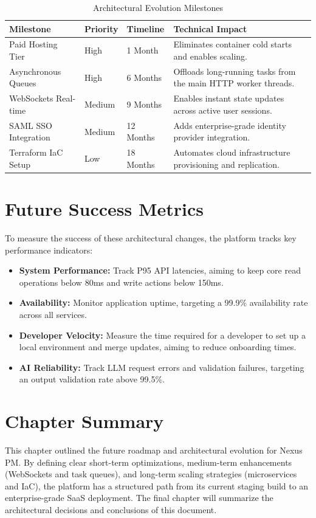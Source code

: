 \begin{table}[h!]
\centering
\small
\renewcommand{\arraystretch}{1.4}
\begin{tabularx}{\textwidth}{l l l X}
    \toprule[1.5pt]
    \rowcolor{primary!5}
    \textbf{\color{primary}Milestone} & \textbf{\color{primary}Priority} & \textbf{\color{primary}Timeline} & \textbf{\color{primary}Technical Impact} \\
    \midrule
    Paid Hosting Tier & High & 1 Month & Eliminates container cold starts and enables scaling. \\
    Asynchronous Queues & High & 6 Months & Offloads long-running tasks from the main HTTP worker threads. \\
    WebSockets Real-time & Medium & 9 Months & Enables instant state updates across active user sessions. \\
    SAML SSO Integration & Medium & 12 Months & Adds enterprise-grade identity provider integration. \\
    Terraform IaC Setup & Low & 18 Months & Automates cloud infrastructure provisioning and replication. \\
    \bottomrule[1.5pt]
\end{tabularx}
\caption{Architectural Evolution Milestones}
\label{tab:architectural_milestones}
\end{table}

\section{Future Success Metrics}
To measure the success of these architectural changes, the platform tracks key performance indicators:
\begin{itemize}
    \item \textbf{System Performance:} Track P95 API latencies, aiming to keep core read operations below 80ms and write actions below 150ms.
    \item \textbf{Availability:} Monitor application uptime, targeting a 99.9\% availability rate across all services.
    \item \textbf{Developer Velocity:} Measure the time required for a developer to set up a local environment and merge updates, aiming to reduce onboarding times.
    \item \textbf{AI Reliability:} Track LLM request errors and validation failures, targeting an output validation rate above 99.5\%.
\end{itemize}

\section{Chapter Summary}
This chapter outlined the future roadmap and architectural evolution for Nexus PM. By defining clear short-term optimizations, medium-term enhancements (WebSockets and task queues), and long-term scaling strategies (microservices and IaC), the platform has a structured path from its current staging build to an enterprise-grade SaaS deployment. The final chapter will summarize the architectural decisions and conclusions of this document.
